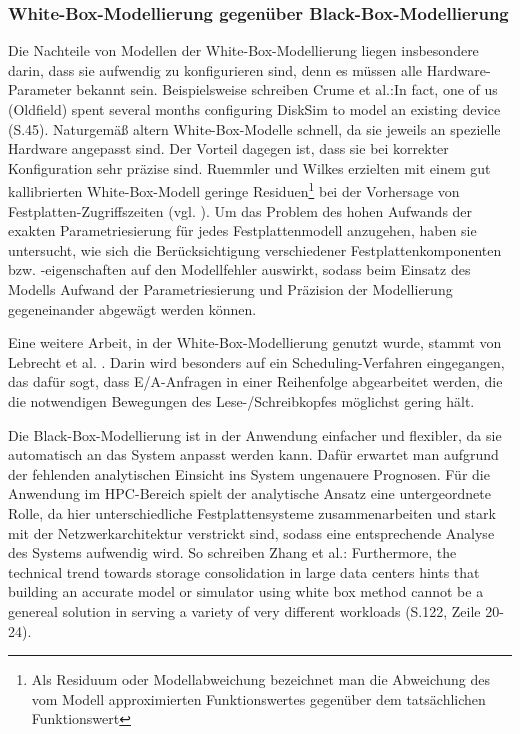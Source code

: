 \documentclass[
	12pt,
	a4paper,
	BCOR10mm,
	DIV14,
	listof=totoc,
	bibliography=totoc,
	headsepline
]{scrreprt}
\begin{document}
\subsubsection{White-Box-Modellierung gegenüber Black-Box-Modellierung}
Die Nachteile von Modellen der White-Box-Modellierung liegen insbesondere darin, dass sie aufwendig zu konfigurieren sind, denn es müssen alle Hardware-Parameter bekannt sein. Beispielsweise schreiben Crume et al.:\glqq In fact, one of us (Oldfield) spent several months configuring DiskSim to model an existing device\grqq{} \cite{Crume:2013:FML:2538542.2538561} (S.45). Naturgemäß altern White-Box-Modelle schnell, da sie jeweils an spezielle Hardware angepasst sind. Der Vorteil dagegen ist, dass sie bei korrekter Konfiguration sehr präzise sind. Ruemmler und Wilkes erzielten mit einem gut kallibrierten White-Box-Modell geringe Residuen\footnote{Als Residuum oder Modellabweichung bezeichnet man die Abweichung des vom Modell approximierten Funktionswertes gegenüber dem tatsächlichen Funktionswert} bei der Vorhersage von Festplatten-Zugriffszeiten (vgl. \cite{Ruemmler94anintroduction}). Um das Problem des hohen Aufwands der exakten Parametriesierung für jedes Festplattenmodell anzugehen, haben sie untersucht, wie sich die Berücksichtigung verschiedener Festplattenkomponenten bzw. -eigenschaften auf den Modellfehler auswirkt, sodass beim Einsatz des Modells Aufwand der Parametriesierung und Präzision der Modellierung gegeneinander abgewägt werden können.

Eine weitere Arbeit, in der White-Box-Modellierung genutzt wurde, stammt von Lebrecht et al. \cite{Lebrecht:2009:10.1109/QEST.2009.31}. Darin wird besonders auf ein Scheduling-Verfahren eingegangen, das dafür sogt, dass E/A-Anfragen in einer Reihenfolge abgearbeitet werden, die die notwendigen Bewegungen des Lese-/Schreibkopfes möglichst gering hält.
\medskip

Die Black-Box-Modellierung ist in der Anwendung einfacher und flexibler, da sie automatisch an das System anpasst werden kann. Dafür erwartet man aufgrund der fehlenden analytischen Einsicht ins System ungenauere Prognosen. Für die Anwendung im HPC-Bereich spielt der analytische Ansatz eine untergeordnete Rolle, da hier unterschiedliche Festplattensysteme zusammenarbeiten und stark mit der Netzwerkarchitektur verstrickt sind, sodass eine entsprechende Analyse des Systems aufwendig wird. So schreiben Zhang et al.: \glqq Furthermore, the technical trend towards storage consolidation in large data centers hints that building an accurate model or simulator using white box method cannot be a genereal solution in serving a variety of very different workloads\grqq{} \cite{DBLP:conf/npc/ZhangLZJC10} (S.122, Zeile 20-24).
\end{document}
